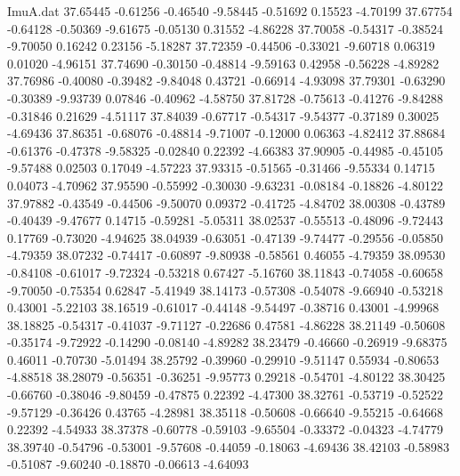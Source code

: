 \begin{filecontents}{ImuA.dat}
  37.65445   -0.61256   -0.46540   -9.58445   -0.51692    0.15523   -4.70199
  37.67754   -0.64128   -0.50369   -9.61675   -0.05130    0.31552   -4.86228
  37.70058   -0.54317   -0.38524   -9.70050    0.16242    0.23156   -5.18287
  37.72359   -0.44506   -0.33021   -9.60718    0.06319    0.01020   -4.96151
  37.74690   -0.30150   -0.48814   -9.59163    0.42958   -0.56228   -4.89282
  37.76986   -0.40080   -0.39482   -9.84048    0.43721   -0.66914   -4.93098
  37.79301   -0.63290   -0.30389   -9.93739    0.07846   -0.40962   -4.58750
  37.81728   -0.75613   -0.41276   -9.84288   -0.31846    0.21629   -4.51117
  37.84039   -0.67717   -0.54317   -9.54377   -0.37189    0.30025   -4.69436
  37.86351   -0.68076   -0.48814   -9.71007   -0.12000    0.06363   -4.82412
  37.88684   -0.61376   -0.47378   -9.58325   -0.02840    0.22392   -4.66383
  37.90905   -0.44985   -0.45105   -9.57488    0.02503    0.17049   -4.57223
  37.93315   -0.51565   -0.31466   -9.55334    0.14715    0.04073   -4.70962
  37.95590   -0.55992   -0.30030   -9.63231   -0.08184   -0.18826   -4.80122
  37.97882   -0.43549   -0.44506   -9.50070    0.09372   -0.41725   -4.84702
  38.00308   -0.43789   -0.40439   -9.47677    0.14715   -0.59281   -5.05311
  38.02537   -0.55513   -0.48096   -9.72443    0.17769   -0.73020   -4.94625
  38.04939   -0.63051   -0.47139   -9.74477   -0.29556   -0.05850   -4.79359
  38.07232   -0.74417   -0.60897   -9.80938   -0.58561    0.46055   -4.79359
  38.09530   -0.84108   -0.61017   -9.72324   -0.53218    0.67427   -5.16760
  38.11843   -0.74058   -0.60658   -9.70050   -0.75354    0.62847   -5.41949
  38.14173   -0.57308   -0.54078   -9.66940   -0.53218    0.43001   -5.22103
  38.16519   -0.61017   -0.44148   -9.54497   -0.38716    0.43001   -4.99968
  38.18825   -0.54317   -0.41037   -9.71127   -0.22686    0.47581   -4.86228
  38.21149   -0.50608   -0.35174   -9.72922   -0.14290   -0.08140   -4.89282
  38.23479   -0.46660   -0.26919   -9.68375    0.46011   -0.70730   -5.01494
  38.25792   -0.39960   -0.29910   -9.51147    0.55934   -0.80653   -4.88518
  38.28079   -0.56351   -0.36251   -9.95773    0.29218   -0.54701   -4.80122
  38.30425   -0.66760   -0.38046   -9.80459   -0.47875    0.22392   -4.47300
  38.32761   -0.53719   -0.52522   -9.57129   -0.36426    0.43765   -4.28981
  38.35118   -0.50608   -0.66640   -9.55215   -0.64668    0.22392   -4.54933
  38.37378   -0.60778   -0.59103   -9.65504   -0.33372   -0.04323   -4.74779
  38.39740   -0.54796   -0.53001   -9.57608   -0.44059   -0.18063   -4.69436
  38.42103   -0.58983   -0.51087   -9.60240   -0.18870   -0.06613   -4.64093

\end{filecontents}
